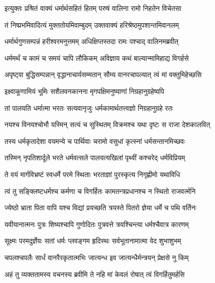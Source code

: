 
\twolineshloka
{इत्युक्तः प्रश्रितं वाक्यं धर्मार्थसहितं हितम्}
{परुषं वालिना रामो निहतेन विचेतसा} %

\twolineshloka
{तं निष्प्रभमिवादित्यं मुक्ततोयमिवाम्बुदम्}
{उक्तवाक्यं हरिश्रेष्ठमुपशान्तमिवानलम्} %

\twolineshloka
{धर्मार्थगुणसम्पन्नं हरीश्वरमनुत्तमम्}
{अधिक्षिप्तस्तदा रामः पश्चाद् वालिनमब्रवीत्} %

\twolineshloka
{धर्ममर्थं च कामं च समयं चापि लौकिकम्}
{अविज्ञाय कथं बाल्यान्मामिहाद्य विगर्हसे} %

\twolineshloka
{अपृष्ट्वा बुद्धिसम्पन्नान् वृद्धानाचार्यसम्मतान्}
{सौम्य वानरचापल्यात् त्वं मां वक्तुमिहेच्छसि} %

\twolineshloka
{इक्ष्वाकूणामियं भूमिः सशैलवनकानना}
{मृगपक्षिमनुष्याणां निग्रहानुग्रहेष्वपि} %

\twolineshloka
{तां पालयति धर्मात्मा भरतः सत्यवानृजुः}
{धर्मकामार्थतत्त्वज्ञो निग्रहानुग्रहे रतः} %

\twolineshloka
{नयश्च विनयश्चोभौ यस्मिन् सत्यं च सुस्थितम्}
{विक्रमश्च यथा दृष्टः स राजा देशकालवित्} %

\twolineshloka
{तस्य धर्मकृतादेशा वयमन्ये च पार्थिवाः}
{चरामो वसुधां कृत्स्नां धर्मसन्तानमिच्छवः} %

\twolineshloka
{तस्मिन् नृपतिशार्दूले भरते धर्मवत्सले}
{पालयत्यखिलां पृथ्वीं कश्चरेद् धर्मविप्रियम्} %

\twolineshloka
{ते वयं मार्गविभ्रष्टं स्वधर्मे परमे स्थिताः}
{भरताज्ञां पुरस्कृत्य निगृह्णीमो यथाविधि} %

\twolineshloka
{त्वं तु सङ्क्लिष्टधर्मश्च कर्मणा च विगर्हितः}
{कामतन्त्रप्रधानश्च न स्थितो राजवर्त्मनि} %

\twolineshloka
{ज्येष्ठो भ्राता पिता वापि यश्च विद्यां प्रयच्छति}
{त्रयस्ते पितरो ज्ञेया धर्मे च पथि वर्तिनः} %

\twolineshloka
{यवीयानात्मनः पुत्रः शिष्यश्चापि गुणोदितः}
{पुत्रवत्ते त्रयश्चिन्त्या धर्मश्चैवात्र कारणम्} %

\twolineshloka
{सूक्ष्मः परमदुर्ज्ञेयः सतां धर्मः प्लवङ्गम}
{हृदिस्थः सर्वभूतानामात्मा वेद शुभाशुभम्} %

\twolineshloka
{चपलश्चपलैः सार्धं वानरैरकृतात्मभिः}
{जात्यन्ध इव जात्यन्धैर्मन्त्रयन् प्रेक्षसे नु किम्} %

\twolineshloka
{अहं तु व्यक्ततामस्य वचनस्य ब्रवीमि ते}
{नहि मां केवलं रोषात् त्वं विगर्हितुमर्हसि} %

